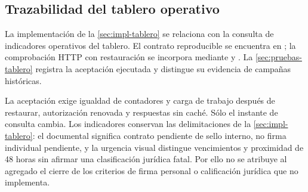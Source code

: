 \subsection{Trazabilidad del tablero operativo}\label{anexo:tablero}

La implementación de la \cref{sec:impl-tablero} se relaciona con la consulta de indicadores operativos del tablero. El contrato reproducible se encuentra en ; la comprobación HTTP con restauración se incorpora mediante  y . La \cref{sec:pruebas-tablero} registra la aceptación ejecutada y distingue su evidencia de campañas históricas.

La aceptación exige igualdad de contadores y carga de trabajo después de restaurar, autorización renovada y respuestas sin caché. Sólo el instante de consulta cambia. Los indicadores conservan las delimitaciones de la \cref{sec:impl-tablero}: el documental significa contrato pendiente de sello interno, no firma individual pendiente, y la urgencia visual distingue vencimientos y proximidad de 48 horas sin afirmar una clasificación jurídica fatal. Por ello no se atribuye al agregado el cierre de los criterios de firma personal o calificación jurídica que no implementa.
